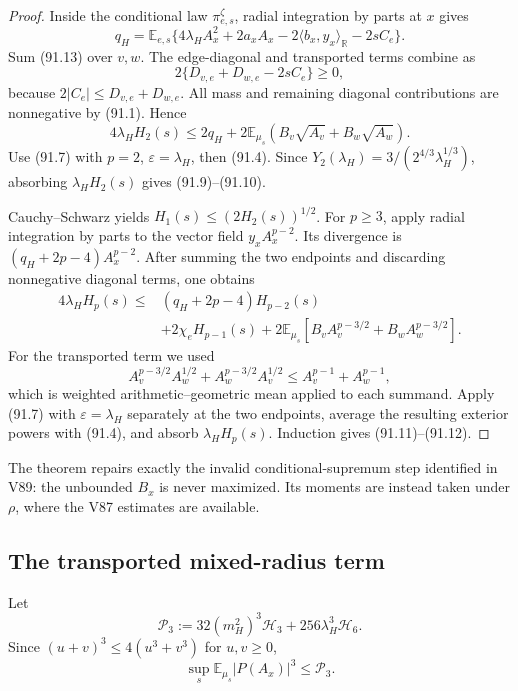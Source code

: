 \documentclass[11pt]{article}
\theoremstyle{remark}
\begin{document}
\begin{proof}
Inside the conditional law \(\pi_{e,s}^{\zeta}\), radial integration
by parts at \(x\) gives
\[
 q_H=\mathbb E_{e,s}
 \{4\lambda_HA_x^2+2a_xA_x
   -2\langle b_x,y_x\rangle_{\mathbb R}-2sC_e\}.    \tag{91.13}
\]
Sum (91.13) over \(v,w\).  The edge-diagonal and transported terms
combine as
\[
 2\{D_{v,e}+D_{w,e}-2sC_e\}\geq0,                  \tag{91.14}
\]
because \(2|C_e|\leq D_{v,e}+D_{w,e}\).  All mass and
remaining diagonal contributions are nonnegative by (91.1).  Hence
\[
 4\lambda_HH_2(s)
 \leq2q_H+2\mathbb E_{\mu_s}
       (B_v\sqrt{A_v}+B_w\sqrt{A_w}).                \tag{91.15}
\]
Use (91.7) with \(p=2\), \(\varepsilon=\lambda_H\), then (91.4).
Since \(Y_2(\lambda_H)=3/(2^{4/3}\lambda_H^{1/3})\), absorbing
\(\lambda_HH_2(s)\) gives (91.9)--(91.10).

Cauchy--Schwarz yields
\(H_1(s)\leq(2H_2(s))^{1/2}\).  For \(p\geq3\), apply radial
integration by parts to the vector field
\(y_xA_x^{p-2}\).  Its divergence is
\((q_H+2p-4)A_x^{p-2}\).  After summing the two endpoints and
discarding nonnegative diagonal terms, one obtains
\[
\begin{aligned}
 4\lambda_HH_p(s)
 \leq{}&(q_H+2p-4)H_{p-2}(s)\\
 &+2\chi_eH_{p-1}(s)
 +2\mathbb E_{\mu_s}
   [B_vA_v^{p-3/2}+B_wA_w^{p-3/2}].                 \tag{91.16}
\end{aligned}
\]
For the transported term we used
\[
 A_v^{p-3/2}A_w^{1/2}+A_w^{p-3/2}A_v^{1/2}
 \leq A_v^{p-1}+A_w^{p-1},                          \tag{91.17}
\]
which is weighted arithmetic--geometric mean applied to each
summand.  Apply (91.7) with \(\varepsilon=\lambda_H\) separately at
the two endpoints, average the resulting exterior powers with
(91.4), and absorb \(\lambda_HH_p(s)\).  Induction gives
(91.11)--(91.12).
\end{proof}

The theorem repairs exactly the invalid conditional-supremum step
identified in V89: the unbounded \(B_x\) is never maximized.  Its
moments are instead taken under \(\rho\), where the V87 estimates are
available.

\subsection{The transported mixed-radius term}

Let
\[
 \mathcal P_3
 :=32(m_H^2)^3\mathcal H_3
   +256\lambda_H^3\mathcal H_6.                     \tag{91.18}
\]
Since \((u+v)^3\leq4(u^3+v^3)\) for \(u,v\geq0\),
\[
 \sup_s\mathbb E_{\mu_s}|P(A_x)|^3\leq\mathcal P_3.\tag{91.19}
\]
\end{document}
